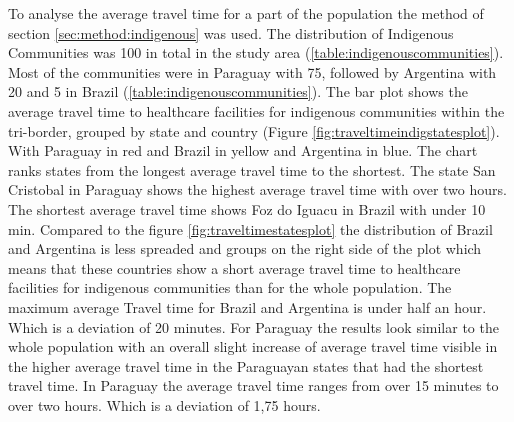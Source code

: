 \documentclass[11pt, a4paper]{report}
\begin{document}
To analyse the average travel time for a part of the population the method of section \ref{sec:method:indigenous} was used. The distribution of Indigenous Communities was 100 in total in the study area (\ref{table:indigenouscommunities}). Most of the communities were in Paraguay with 75, followed by Argentina with 20 and 5 in Brazil (\ref{table:indigenouscommunities}). The bar plot shows the average travel time to healthcare facilities for indigenous communities within the tri-border, grouped by state and country (Figure \ref{fig:traveltimeindigstatesplot}). With Paraguay in red and Brazil in yellow and Argentina in blue. The chart ranks states from the longest average travel time to the shortest. The state San Cristobal  in Paraguay shows the highest average travel time with over two hours. The shortest average travel time shows Foz do Iguacu in Brazil with under 10 min. Compared to the figure \ref{fig:traveltimestatesplot} the distribution of Brazil and Argentina is  less spreaded and groups on the right side of the plot which means that these countries show a short average travel time to healthcare facilities for indigenous communities than for the whole population. The maximum average Travel time for Brazil and Argentina is under half an hour. Which is a deviation of  20 minutes. For Paraguay the results look similar to the whole population with an overall slight increase of average travel time visible in the higher average travel time in the Paraguayan states that had the shortest travel time. In Paraguay the average travel time ranges from over 15 minutes  to over two hours. Which is a deviation of 1,75 hours. 
\end{document}
